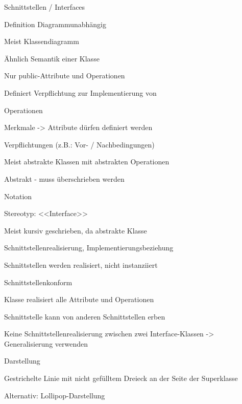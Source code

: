 \documentclass[a4paper]{article}
\begin{document}
\begin{multicols}{3}
  Schnittstellen / Interfaces
  \begin{itemize*}
    \item Definition Diagrammunabhängig
          \begin{itemize*}
            \item Meist Klassendiagramm
          \end{itemize*}
    \item Ähnlich Semantik einer Klasse
          \begin{itemize*}
            \item Nur public-Attribute und Operationen
          \end{itemize*}
    \item Definiert Verpflichtung zur Implementierung von
          \begin{itemize*}
            \item Operationen
            \item Merkmale -> Attribute dürfen definiert werden
            \item Verpflichtungen (z.B.: Vor- / Nachbedingungen)
          \end{itemize*}
    \item Meist abstrakte Klassen mit abstrakten Operationen
    \item Abstrakt - muss überschrieben werden
    \item Notation
          \begin{itemize*}
            \item Stereotyp: <<Interface>>
            \item Meist kursiv geschrieben, da abstrakte Klasse
          \end{itemize*}
  \end{itemize*}

  Schnittstellenrealisierung, Implementierungsbeziehung
  \begin{itemize*}
    \item Schnittstellen werden realisiert, nicht instanziiert
    \item Schnittstellenkonform
          \begin{itemize*}
            \item Klasse realisiert alle Attribute und Operationen
          \end{itemize*}
    \item Schnittstelle kann von anderen Schnittstellen erben
    \item Keine Schnittstellenrealisierung zwischen zwei Interface-Klassen -> Generalisierung verwenden
    \item Darstellung
          \begin{itemize*}
            \item Gestrichelte Linie mit nicht gefülltem Dreieck an der Seite der Superklasse
            \item Alternativ: Lollipop-Darstellung
          \end{itemize*}
  \end{itemize*}



\end{multicols}
\end{document}
